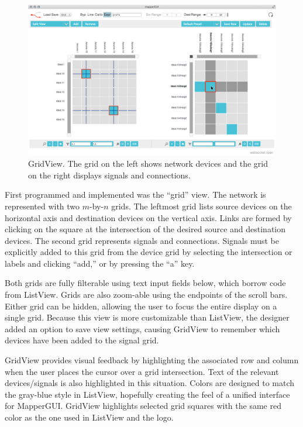 \begin{figure}[ht]
\centering
	\includegraphics[width=\textwidth]{figures/grid_w_cursor}
\caption{GridView. The grid on the left shows network devices and the grid on the right displays signals and connections.}
\label{fig:grid}
\end{figure}

First programmed and implemented was the ``grid'' view. The network is represented with two $m$-by-$n$ grids. The leftmost grid lists source devices on the horizontal axis and destination devices on the vertical axis. Links are formed by clicking on the square at the intersection of the desired source and destination devices. The second grid represents signals and connections. Signals must be explicitly added to this grid from the device grid by selecting the intersection or labels and clicking ``add,'' or by pressing the ``a'' key. 

Both grids are fully filterable using text input fields below, which borrow code from ListView. Grids are also zoom-able using the endpoints of the scroll bars. Either grid can be hidden, allowing the user to focus the entire display on a single grid. Because this view is more customizable than ListView, the designer added an option to save view settings, causing GridView to remember which devices have been added to the signal grid.

GridView provides visual feedback by highlighting the associated row and column when the user places the cursor over a grid intersection. Text of the relevant devices/signals is also highlighted in this situation. Colors are designed to match the gray-blue style in ListView, hopefully creating the feel of a unified interface for MapperGUI. GridView highlights selected grid squares with the same red color as the one used in ListView and the logo.

